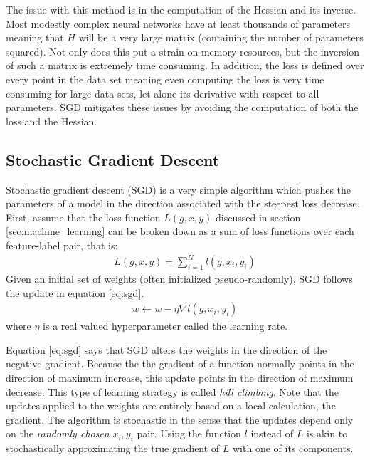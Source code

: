 The issue with this method is in the computation of the Hessian and its inverse.  Most modestly complex neural networks have at least thousands of parameters meaning that $H$ will be a very large matrix (containing the number of parameters squared).  Not only does this put a strain on memory resources, but the inversion of such a matrix is extremely time consuming.  In addition, the loss is defined over every point in the data set meaning even computing the loss is very time consuming for large data sets, let alone its derivative with respect to all parameters.  SGD mitigates these issues by avoiding the computation of both the loss and the Hessian.

\subsection{Stochastic Gradient Descent}\label{sec:sgd}
Stochastic gradient descent (SGD) is a very simple algorithm which pushes the parameters of a model in the direction associated with the steepest loss decrease.  First, assume that the loss function $L(g,x,y)$ discussed in section \ref{sec:machine_learning} can be broken down as a sum of loss functions over each feature-label pair, that is:
\begin{align}
L(g,x,y) = \sum_{i=1}^N l(g,x_i,y_i)
\end{align}
Given an initial set of weights (often initialized pseudo-randomly), SGD follows the update in equation \ref{eq:sgd}.
\begin{align}\label{eq:sgd}
w \leftarrow w - \eta\nabla l(g,x_i,y_i)
\end{align}
where $\eta$ is a real valued hyperparameter called the learning rate.

Equation \ref{eq:sgd} says that SGD alters the weights in the direction of the negative gradient.  Because the the gradient of a function normally points in the direction of maximum increase, this update points in the direction of maximum decrease.  This type of learning strategy is called \textit{hill climbing}.  Note that the updates applied to the weights are entirely based on a local calculation, the gradient.  The algorithm is stochastic in the sense that the updates depend only on the \textit{randomly chosen} $x_i,y_i$ pair.  Using the function $l$ instead of $L$ is akin to stochastically approximating the true gradient of $L$ with one of its components.  

